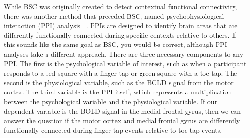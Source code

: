 \documentclass[phd,appendix,figures]{uithesis}
\begin{document}
While BSC was originally created to detect contextual functional connectivity, there was another method
that preceded BSC, named psychophysiological interaction (PPI) analysis ~\cite{Friston1997}. 
PPIs are designed to identify brain areas that are differently functionally connected
during specific contexts relative to others.
If this sounds like the same goal as BSC, you would be correct, although PPI
analyses take a different approach.
There are three necessary components to any PPI.
The first is the psychological variable of interest, such as when a participant
responds to a red square with a finger tap or green square with a toe tap.
The second is the physiological variable, such as the BOLD signal from
the motor cortex.
The third variable is the PPI itself, which represents a multiplication
between the psychological variable and the physiological variable.
If our dependent variable is the BOLD signal in the medial frontal gyrus,
then we can answer the question if the motor cortex and medial frontal gyrus
are differently functionally connected during finger tap events relative
to toe tap events.
\end{document}
